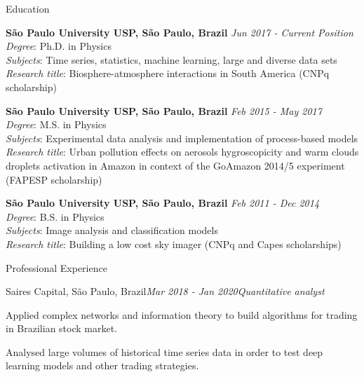 \documentclass{resume} %
\begin{document}

\begin{rSection}{Education}

{\bf São Paulo University USP, São Paulo, Brazil} \hfill {\em Jun 2017 - Current Position} \\
\textit{Degree}: Ph.D. in Physics \\
\textit{Subjects}: Time series, statistics, machine learning, large and diverse data sets  \\
\textit{Research title}: Biosphere-atmosphere interactions in South America (CNPq scholarship)

{\bf São Paulo University USP, São Paulo, Brazil} \hfill {\em Feb 2015 - May 2017} \\
\textit{Degree}: M.S. in Physics \\
\textit{Subjects}: Experimental data analysis and implementation of process-based models \\
\textit{Research title}: Urban pollution effects on aerosols hygroscopicity and warm clouds droplets activation in Amazon in context of the GoAmazon 2014/5 experiment (FAPESP scholarship) 

{\bf São Paulo University USP, São Paulo, Brazil} \hfill {\em Feb 2011 - Dec 2014} \\
\textit{Degree}: B.S. in Physics \\
\textit{Subjects}: Image analysis and classification models \\
\textit{Research title}: Building a low cost sky imager (CNPq and Capes scholarships) 

\end{rSection}


\begin{rSection}{Professional Experience}

\begin{rSubsection}{Saires Capital, São Paulo, Brazil}{\em Mar 2018 - Jan 2020}{\em Quantitative analyst}{}
\item Applied complex networks and information theory to build algorithms for trading in Brazilian stock market. 
\item Analysed large volumes of historical time series data in order to test deep learning models and other trading strategies. 
\end{rSubsection}

\end{rSection}
\end{document}
